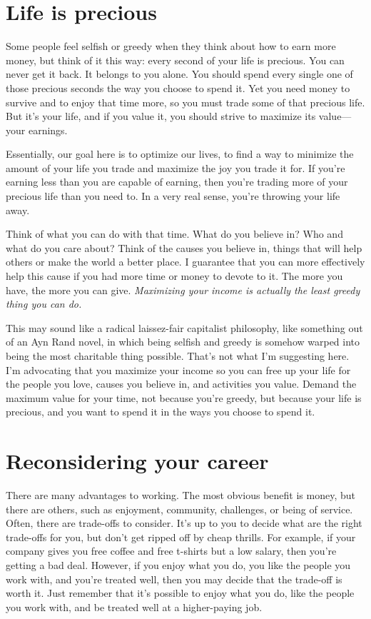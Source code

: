 \section{Life is precious}

Some people feel selfish or greedy when they think about how to earn more money, but think of it this way: every second of your life is precious. You can never get it back. It belongs to you alone. You should spend every single one of those precious seconds the way you choose to spend it. Yet you need money to survive and to enjoy that time more, so you must trade some of that precious life. But it's your life, and if you value it, you should strive to maximize its value---your earnings.

Essentially, our goal here is to optimize our lives, to find a way to minimize the amount of your life you trade and maximize the joy you trade it for. If you're earning less than you are capable of earning, then you're trading more of your precious life than you need to. In a very real sense, you're throwing your life away.

Think of what you can do with that time. What do you believe in? Who and what do you care about? Think of the causes you believe in, things that will help others or make the world a better place. I guarantee that you can more effectively help this cause if you had more time or money to devote to it. The more you have, the more you can give. \emph{Maximizing your income is actually the least greedy thing you can do.}

This may sound like a radical laissez-fair capitalist philosophy, like something out of an Ayn Rand novel, in which being selfish and greedy is somehow warped into being the most charitable thing possible. That's not what I'm suggesting here. I'm advocating that you maximize your income so you can free up your life for the people you love, causes you believe in, and activities you value. Demand the maximum value for your time, not because you're greedy, but because your life is precious, and you want to spend it in the ways you choose to spend it.

\section{Reconsidering your career}
There are many advantages to working. The most obvious benefit is money, but there are others, such as enjoyment, community, challenges, or being of service. Often, there are trade-offs to consider. It's up to you to decide what are the right trade-offs for you, but don't get ripped off by cheap thrills. For example, if your company gives you free coffee and free t-shirts but a low salary, then you're getting a bad deal. However, if you enjoy what you do, you like the people you work with, and you're treated well, then you may decide that the trade-off is worth it. Just remember that it's possible to enjoy what you do, like the people you work with, and be treated well at a higher-paying job.

